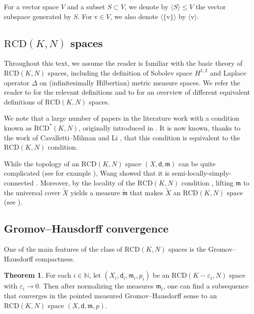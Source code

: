 \documentclass[12pt]{amsart}
\theoremstyle{definition}
\def\fnum{equation}
\newtheorem{theorem}[\fnum]{Theorem}
\numberwithin{equation}{section}
\newcommand{\vv}{\text{v}}
\newcommand{\sobo}{H^{1,2}}
\newcommand{\rcd}{\text{RCD}}
\newcommand{\mm}{\mathfrak{m}}
\begin{document}
For a vector space $V$ and a subset $S \subset V$, we denote by $\langle S \rangle \leq V$ the vector subspace generated by $S$. For $\vv \in V$, we also denote $\langle \{ \vv \} \rangle$ by $\langle \vv \rangle $.

\subsection{$\rcd (K,N)$ spaces}  Throughout this text, we assume the reader is familiar with the basic theory of $\rcd (K,N)$ spaces, including the definition of Sobolev space $\sobo$ and  Laplace operator $\Delta$ on (infinitesimally Hilbertian) metric measure spaces. We refer the reader to \cite{lott-villani, sturm-i, sturm-ii, ambrosio-gigli-savare, ambrosio-gigli-mondino-rajala} for the relevant definitions and to \cite{erbar-kuwada-sturm} for an overview of different equivalent definitions of $\rcd (K,N)$ spaces.



    

We note that a large number of papers in the literature work with a condition known as $\rcd ^{\ast} (K,N)$, originally  introduced in \cite{bacher-sturm}.  It is now known, thanks to the work of Cavalletti--Milman \cite{cavalletti-milman} and Li \cite{li}, that this condition is equivalent to the $\rcd (K,N)$ condition.

While the topology of an $\rcd (K,N)$ space $(X,\mathsf{d}, \mm )$ can be quite complicated (see for example \cite{hupp-naber-wang, zhou}), Wang  showed that it is semi-locally-simply-connected \cite{wang}. Moreover, by the locality of the $\rcd (K,N)$ condition \cite[Section 3]{erbar-kuwada-sturm}, lifting $\mm$ to the universal cover $\tilde{X}$ yields a measure $\tilde{\mm}$ that makes $\tilde{X}$ an $\rcd (K,N)$ space  (see \cite{mondino-wei}). 


\subsection{Gromov--Hausdorff convergence} One of the main features of the class of  $\rcd (K,N)$ spaces is the Gromov--Hausdorff compactness.  




\begin{theorem}\label{thm:compactness}
 For each $i \in \mathbb{N}$, let  $(X_i,\mathsf{d}_i, \mm _i,p_i)$ be an  $\rcd (K - \varepsilon_i ,N)$ space with $\varepsilon _i \to 0$. Then after normalizing the measures $\mm_i$, one can find a subsequence that converges in the pointed measured Gromov--Hausdorff sense to an $\rcd (K,N)$ space $(X,\mathsf{d}, \mm , p)$.
\end{theorem}
\end{document}
